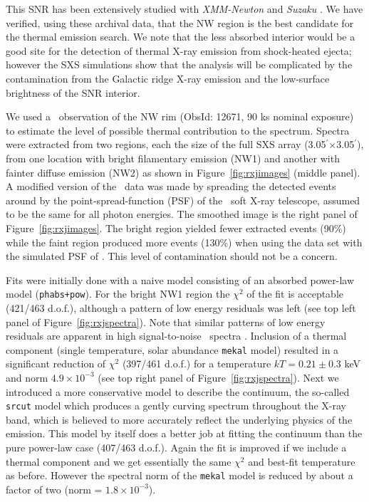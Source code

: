 \documentclass[11pt,a4paper]{article}
\begin{document}
{This SNR has been extensively studied with \textit{XMM-Newton} \citep{cc04, hiraga05}
and {\it Suzaku} \citep{takahashi08, tanaka08, sano13}. We have verified, using these archival data,
 that the NW region is the best candidate for the thermal emission search.
 We note that the less absorbed interior would be a good site for the detection of
 thermal X-ray emission from shock-heated ejecta;
  however the SXS simulations show that the analysis will be complicated
 by the contamination from the Galactic ridge X-ray emission and the low-surface brightness of the SNR interior.


We used a \chandra\ observation of the NW rim (ObsId: 12671, 90 ks
nominal exposure) to estimate the level of possible thermal
contribution to the spectrum.  Spectra were extracted from two
regions, each the size of the full SXS array
(3.05$^\prime$$\times$3.05$^\prime$), from one location with bright
filamentary emission (NW1) and another with fainter diffuse emission
(NW2) as shown in Figure~\ref{fig:rxjimages} (middle panel). A modified
version of the \chandra\ data was made by spreading the detected
events around by the point-spread-function (PSF) of the \ah\ soft
X-ray telescope, assumed to be the same for all photon energies.  The
smoothed image is the right panel of Figure~\ref{fig:rxjimages}.  The
bright region yielded fewer extracted events (90\%) while the faint
region produced more events (130\%) when using the data set with the
simulated PSF of \ah. This level of contamination should not be a
concern.

Fits were initially done with a naive model consisting of an absorbed
power-law model ({\tt phabs+pow}). For the bright NW1 region the
$\chi^2$ of the fit is acceptable (421/463 d.o.f.), although a pattern
of low energy residuals was left (see top left panel of
Figure~\ref{fig:rxjspectra}). Note that similar patterns of low energy
residuals are apparent in high signal-to-noise \suzaku\ spectra
\citep{takahashi08}.  Inclusion of a thermal component (single
temperature, solar abundance {\tt mekal} model) resulted in a
significant reduction of $\chi^2$ (397/461 d.o.f.) for a temperature
$kT=0.21\pm0.3$ keV and norm $4.9\times 10^{-3}$ (see top right panel
of Figure~\ref{fig:rxjspectra}).  Next we introduced a more conservative
model to describe the continuum, the so-called {\tt srcut} model which
produces a gently curving spectrum throughout the X-ray band, which is
believed to more accurately reflect the underlying physics of the
emission.  This model by itself does a better job at fitting the
continuum than the pure power-law case (407/463 d.o.f.). Again the fit
is improved if we include a thermal component and we get essentially
the same $\chi^2$ and best-fit temperature as before.  However the
spectral norm of the {\tt mekal} model is reduced by about a factor of
two (norm = $1.8\times 10^{-3}$).



}
\end{document}
